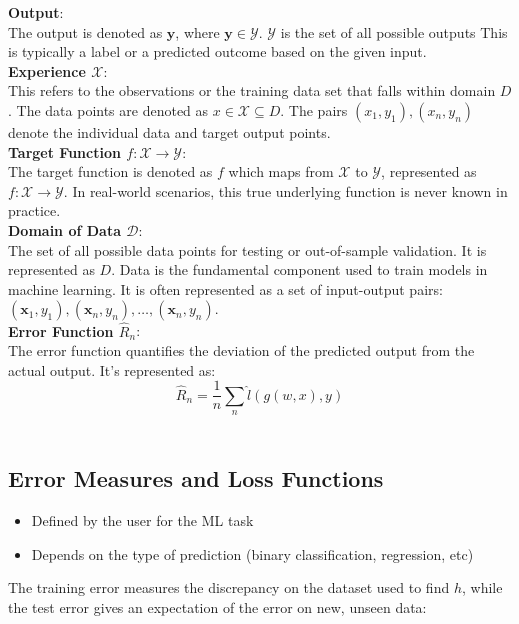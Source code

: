 \textbf{Output}: \\
The output is denoted as $\mathbf{y}$, where $\mathbf{y}\in\mathcal{Y}$. $\mathcal{Y}$ is the set of all possible outputs This is typically a label or a predicted outcome based on the given input.\\

\textbf{Experience \(\mathcal{X}\)}: \\
This refers to the observations or the training data set that falls within domain \(D\). The data points are denoted as \(x \in \mathcal{X} \subseteq D\). The pairs \((x_1, y_1), (x_n, y_n)\) denote the individual data and target output points.\\


\textbf{Target Function $f:\mathcal{X}\to\mathcal{Y}$}: \\
The target function is denoted as $f$ which maps from $\mathcal{X}$ to $\mathcal{Y}$, represented as $f:\mathcal{X}\to\mathcal{Y}$. In real-world scenarios, this true underlying function is never known in practice.\\

\textbf{Domain of Data $\mathcal{D}$}: \\
The set of all possible data points for testing or out-of-sample validation. It is represented as \(D\). Data is the fundamental component used to train models in machine learning. It is often represented as a set of input-output pairs: $(\mathbf{x}_1,y_1),(\mathbf{x}_n,y_n),\ldots,(\mathbf{x}_n,y_n)$. \\

\textbf{Error Function $\widehat{R}_n$}: \\
The error function quantifies the deviation of the predicted output from the actual output. It's represented as:
\[
\widehat{R}_n=\frac1n\sum_n\widehat{l}(g(w,x),y)
\]\\

\subsection{Error Measures and Loss Functions}
\begin{itemize}
    \item Defined by the user for the ML task
    \item Depends on the type of prediction (binary classification, regression, etc)
\end{itemize}

The training error measures the discrepancy on the dataset used to find \( h \), while the test error gives an expectation of the error on new, unseen data:

